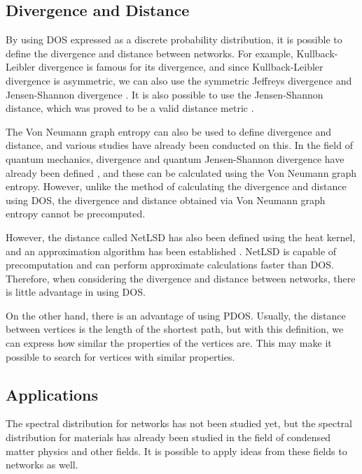 \documentclass[senior,final,11pt]{iscs-thesis}
\begin{document}
\subsection{Divergence and Distance}
By using DOS expressed as a discrete probability distribution, it is possible to define the divergence and distance between networks. For example, Kullback-Leibler divergence \cite{kullback1951information} is famous for its divergence, and since Kullback-Leibler divergence is asymmetric, we can also use the symmetric Jeffreys divergence and Jensen-Shannon divergence \cite{nielsen2019jensen, lin1991divergence, jeffreys1946invariant}. It is also possible to use the Jensen-Shannon distance, which was proved to be a valid distance metric \cite{endres2003new}.

The Von Neumann graph entropy can also be used to define divergence and distance, and various studies have already been conducted on this. In the field of quantum mechanics, divergence and quantum Jensen-Shannon divergence have already been defined \cite{briet2009properties, lamberti2008metric}, and these can be calculated using the Von Neumann graph entropy. However, unlike the method of calculating the divergence and distance using DOS, the divergence and distance obtained via Von Neumann graph entropy cannot be precomputed.

However, the distance called NetLSD has also been defined using the heat kernel, and an approximation algorithm has been established \cite{tsitsulin2018netlsd,tsitsulin2020just}. NetLSD is capable of precomputation and can perform approximate calculations faster than DOS. Therefore, when considering the divergence and distance between networks, there is little advantage in using DOS.

On the other hand, there is an advantage of using PDOS. Usually, the distance between vertices is the length of the shortest path, but with this definition, we can express how similar the properties of the vertices are. This may make it possible to search for vertices with similar properties.

\subsection{Applications}
The spectral distribution for networks has not been studied yet, but the spectral distribution for materials has already been studied in the field of condensed matter physics and other fields. It is possible to apply ideas from these fields to networks as well.
\end{document}
